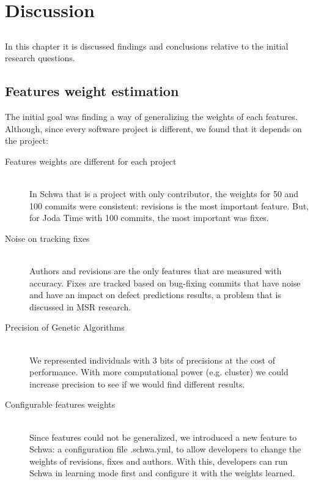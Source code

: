 \chapter{Discussion} \label{chap:discussion}

\section*{}
In this chapter it is discussed findings and conclusions relative to the initial
research questions.

\section{Features weight estimation}
The initial goal was finding a way of generalizing the weights of each features.
Although, since every software project is different, we found that it depends on
the project:

\begin{description}
\item[Features weights are different for each project] \hfill \\
In Schwa that is a project with only contributor, the weights for 50 and 100
commits were consistent: revisions is the most important feature. But, for Joda
Time with 100 commits, the most important was fixes.

\item[Noise on tracking fixes] \hfill \\
Authors and revisions are the only features that are measured with accuracy.
Fixes are tracked based on bug-fixing commits that have noise and have an impact
on defect predictions results, a problem that is discussed in MSR
research\cite{herzig-tr-2012}.

\item[Precision of Genetic Algorithms] \hfill \\
We represented individuals with 3 bits of precisions at the cost of performance.
With more computational power (e.g. cluster) we could increase precision to see
if we would find different results.

\item[Configurable features weights] \hfill \\
Since features could not be generalized, we introduced a new feature to Schwa:
a configuration file .schwa.yml, to allow developers to change the weights of
revisions, fixes and authors. With this, developers can run Schwa in learning
mode first and configure it with the weights learned.
\end{description}

